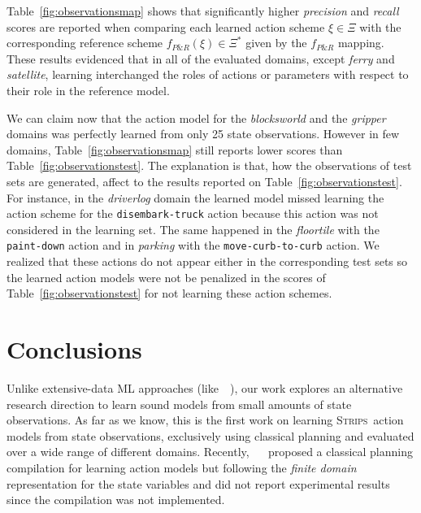 \documentclass{article}
\newcommand{\strips}{\textsc{Strips}}     %
\begin{document}
Table~\ref{fig:observationsmap} shows that significantly higher {\em precision} and {\em recall} scores are reported when comparing each learned action scheme $\xi\in\Xi$ with the corresponding reference scheme $f_{P\&R}(\xi)\in \Xi^*$ given by the $f_{P\&R}$ mapping. These results evidenced that in all of the evaluated domains, except {\em ferry} and {\em satellite}, learning interchanged the roles of actions or parameters with respect to their role in the reference model.

We can claim now that the action model for the {\em blocksworld} and the {\em gripper} domains was perfectly learned from only 25 state observations. However in few domains, Table~\ref{fig:observationsmap} still reports lower scores than Table~\ref{fig:observationstest}. The explanation is that, how the observations of test sets are generated, affect to the results reported on Table~\ref{fig:observationstest}. For instance, in the {\em driverlog} domain the learned model missed learning the action scheme for the {\tt disembark-truck} action because this action was not considered in the learning set. The same happened in the {\em floortile} with the {\tt paint-down} action and in {\em parking} with the {\tt move-curb-to-curb} action. We realized that these actions do not appear either in the corresponding test sets so the learned action models were not be penalized in the scores of Table~\ref{fig:observationstest} for not learning these action schemes.  %


\section{Conclusions}
Unlike extensive-data ML approaches (like~\citeauthor{asai2017classical}~\citeyear{asai2017classical}), our work explores an alternative research direction to learn sound models from small amounts of state observations. As far as we know, this is the first work on learning \strips\ action models from state observations, exclusively using classical planning and evaluated over a wide range of different domains. Recently, ~\citeauthor{stern2017efficient}~\citeyear{stern2017efficient} proposed a classical planning compilation for learning action models but following the {\em finite domain} representation for the state variables and did not report experimental results since the compilation was not implemented.
\end{document}
